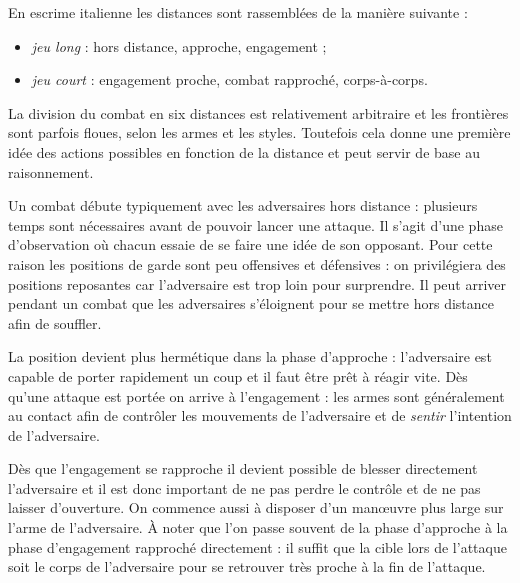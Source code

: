 \begin{definition}

\noindent
En escrime italienne les distances sont rassemblées de la manière suivante :
\begin{itemize}
	\item \emph{jeu long} : hors distance, approche, engagement ;
	
	\item \emph{jeu court} : engagement proche, combat rapproché, corps-à-corps.
\end{itemize}
\end{definition}


La division du combat en six distances est relativement arbitraire et les frontières sont parfois floues, selon les armes et les styles.
Toutefois cela donne une première idée des actions possibles en fonction de la distance et peut servir de base au raisonnement.

Un combat débute typiquement avec les adversaires hors distance : plusieurs temps sont nécessaires avant de pouvoir lancer une attaque.
Il s'agit d'une phase d'observation où chacun essaie de se faire une idée de son opposant.
Pour cette raison les positions de garde sont peu offensives et défensives : on privilégiera des positions reposantes car l'adversaire est trop loin pour surprendre.
Il peut arriver pendant un combat que les adversaires s'éloignent pour se mettre hors distance afin de souffler.

La position devient plus hermétique dans la phase d'approche : l'adversaire est capable de porter rapidement un coup et il faut être prêt à réagir vite.
Dès qu'une attaque est portée on arrive à l'engagement : les armes sont généralement au contact afin de contrôler les mouvements de l'adversaire et de \emph{sentir} l'intention de l'adversaire.

Dès que l'engagement se rapproche il devient possible de blesser directement l'adversaire et il est donc important de ne pas perdre le contrôle et de ne pas laisser d'ouverture.
On commence aussi à disposer d'un manœuvre plus large sur l'arme de l'adversaire.
À noter que l'on passe souvent de la phase d'approche à la phase d'engagement rapproché directement : il suffit que la cible lors de l'attaque soit le corps de l'adversaire pour se retrouver très proche à la fin de l'attaque.

